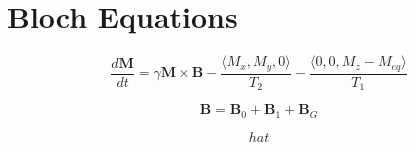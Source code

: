\section{Bloch Equations}


\begin{displaymath}
  \frac{d\mathbf{M}}{dt} = \gamma \mathbf{M} \times \mathbf{B} - \frac{\langle M_x, M_y, 0 \rangle}{T_2} - \frac{\langle 0, 0, M_z - M_{eq} \rangle}{T_1}
\end{displaymath}


\begin{displaymath}
  \mathbf{B} = \mathbf{B}_0 + \mathbf{B}_1 + \mathbf{B}_G
\end{displaymath}


\begin{displaymath}
  hat
\end{displaymath}


